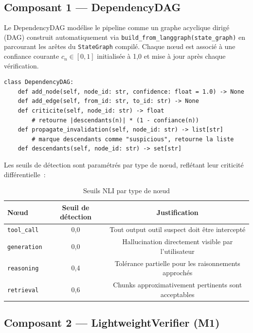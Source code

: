 \documentclass[12pt,a4paper]{article}
\begin{document}
\subsection{Composant 1 --- DependencyDAG}

Le DependencyDAG modélise le pipeline comme un graphe acyclique dirigé (DAG) construit automatiquement via \texttt{build\_from\_langgraph(state\_graph)} en parcourant les arêtes du \texttt{StateGraph} compilé. Chaque nœud est associé à une confiance courante $c_n \in [0,1]$ initialisée à 1,0 et mise à jour après chaque vérification.

\begin{lstlisting}[caption={Interface du DependencyDAG}, label={lst:dag}]
class DependencyDAG:
    def add_node(self, node_id: str, confidence: float = 1.0) -> None
    def add_edge(self, from_id: str, to_id: str) -> None
    def criticite(self, node_id: str) -> float
        # retourne |descendants(n)| * (1 - confiance(n))
    def propagate_invalidation(self, node_id: str) -> list[str]
        # marque descendants comme "suspicious", retourne la liste
    def descendants(self, node_id: str) -> set[str]
\end{lstlisting}

Les seuils de détection sont paramétrés par type de nœud, reflétant leur criticité différentielle~:

\begin{table}[H]
\centering
\caption{Seuils NLI par type de nœud}
\label{tab:thresholds}
\begin{tabular}{lcc}
\toprule
\textbf{Nœud} & \textbf{Seuil de détection} & \textbf{Justification} \\
\midrule
\texttt{tool\_call} & 0,0 & Tout output outil suspect doit être intercepté \\
\texttt{generation} & 0,0 & Hallucination directement visible par l'utilisateur \\
\texttt{reasoning} & 0,4 & Tolérance partielle pour les raisonnements approchés \\
\texttt{retrieval} & 0,6 & Chunks approximativement pertinents sont acceptables \\
\bottomrule
\end{tabular}
\end{table}

\subsection{Composant 2 --- LightweightVerifier (M1)}
\label{sec:m1}
\end{document}
